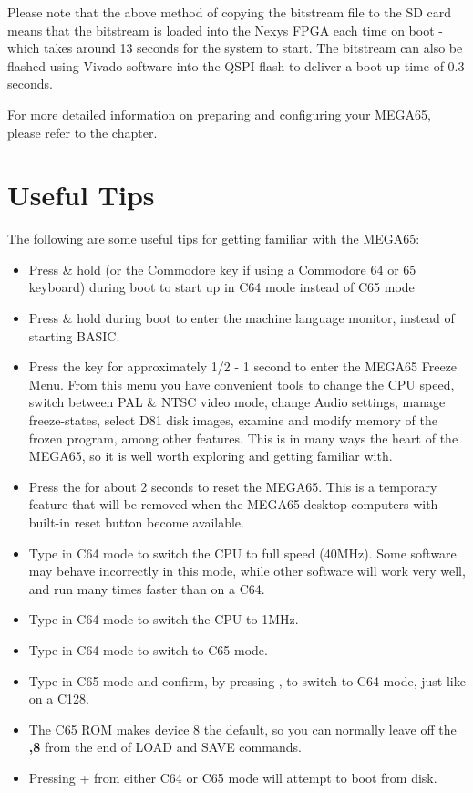 Please note that the above method of copying the bitstream file to the SD card means that the bitstream is loaded into the Nexys FPGA each time on boot - which takes around 13 seconds for the system to start. The bitstream can also be flashed using Vivado software into the QSPI flash to deliver a boot up time of 0.3 seconds.  

For more detailed information on preparing and configuring your MEGA65, please refer to the  chapter. 

\section{Useful Tips}

The following are some useful tips for getting familiar with the MEGA65:

\begin{itemize}

\item{Press \& hold \megasymbolkey (or the Commodore key if using a Commodore 64 or 65 keyboard) during boot to start up in C64 mode instead of C65 mode}
 \item{Press \& hold  during boot to enter the machine language monitor, instead of starting BASIC.}
\item{Press the  key for approximately 1/2 - 1 second to enter the MEGA65 Freeze Menu.  From this menu
  you have convenient tools to change the CPU speed, switch between PAL \& NTSC video mode, change Audio settings, manage freeze-states,
   select D81 disk images, examine and modify memory of the frozen program, among other features.  This is in many ways the heart of the MEGA65, so it is well worth exploring and getting familiar with.}
\item{Press the  for about 2 seconds to reset the MEGA65.  This is a temporary feature that will be removed when the MEGA65 desktop computers with built-in reset button become available.}
\item{Type  in C64 mode to switch  the CPU to full speed (40MHz). Some software may behave incorrectly in this mode, while other software will work very well, and run many times faster than on a C64.}
\item{Type  in C64 mode to switch the CPU to 1MHz.}
\item{Type  in C64 mode to switch to C65 mode.}
\item{Type  in C65 mode and confirm, by pressing , to switch to C64 mode, just like on a C128.}
\item{The C65 ROM makes device 8 the default, so you can normally leave off the \textbf{,8} from the end of LOAD and SAVE commands.}
\item{Pressing  +  from either C64 or C65 mode will attempt to boot from disk.}
\end{itemize}

